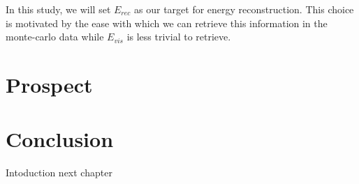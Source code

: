 In this study, we will set $E_{rec}$ as our target for energy reconstruction. This choice is motivated by the ease with which we can retrieve this information in the monte-carlo data while $E_{vis}$  is less trivial to retrieve.



\section{Prospect}
\label{sec:jcnn:prospect}

\section{Conclusion}
Intoduction next chapter
